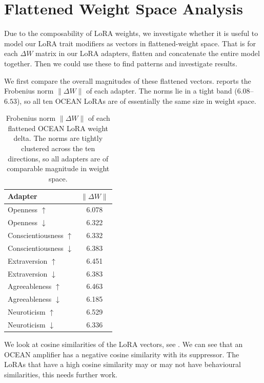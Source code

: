 \section{Flattened Weight Space Analysis}\label{sec:flattened_weight_space}

Due to the composability of LoRA weights, we investigate whether it is useful to model our LoRA trait modifiers as vectors in flattened-weight space. That is for each $\Delta W$ matrix in our LoRA adapters, flatten and concatenate the entire model together. Then we could use these to find patterns and investigate results.

We first compare the overall magnitudes of these flattened vectors.  reports the Frobenius norm $\|\Delta W\|$ of each adapter. The norms lie in a tight band ($6.08$--$6.53$), so all ten OCEAN LoRAs are of essentially the same size in weight space.

\begin{table}[H]
\centering
\begin{tabular}{l c}
\toprule
Adapter & $\|\Delta W\|$ \\
\midrule
Openness $\uparrow$            & 6.078 \\
Openness $\downarrow$          & 6.322 \\
Conscientiousness $\uparrow$   & 6.332 \\
Conscientiousness $\downarrow$ & 6.383 \\
Extraversion $\uparrow$        & 6.451 \\
Extraversion $\downarrow$      & 6.383 \\
Agreeableness $\uparrow$       & 6.463 \\
Agreeableness $\downarrow$     & 6.185 \\
Neuroticism $\uparrow$         & 6.529 \\
Neuroticism $\downarrow$       & 6.336 \\
\bottomrule
\end{tabular}
\caption{Frobenius norm $\|\Delta W\|$ of each flattened OCEAN LoRA weight delta. The norms are tightly clustered across the ten directions, so all adapters are of comparable magnitude in weight space.}
\label{tab:flattened_norms}
\end{table}

We look at cosine similarities of the LoRA vectors, see . We can see that an OCEAN amplifier has a negative cosine similarity with its suppressor. The LoRAs that have a high cosine similarity may or may not have behavioural similarities, this needs further work.

